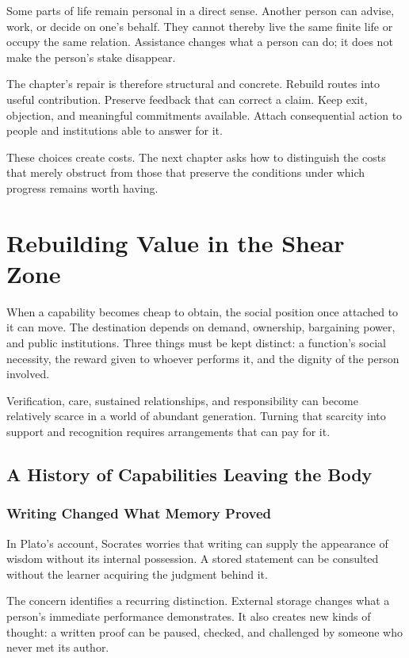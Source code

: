 \documentclass[11pt,openany]{book}
\begin{document}
Some parts of life remain personal in a direct sense. Another person can advise, work, or decide on one's behalf. They cannot thereby live the same finite life or occupy the same relation. Assistance changes what a person can do; it does not make the person's stake disappear.

The chapter's repair is therefore structural and concrete. Rebuild routes into useful contribution. Preserve feedback that can correct a claim. Keep exit, objection, and meaningful commitments available. Attach consequential action to people and institutions able to answer for it.

These choices create costs. The next chapter asks how to distinguish the costs that merely obstruct from those that preserve the conditions under which progress remains worth having.

\chapter{Rebuilding Value in the Shear Zone}

When a capability becomes cheap to obtain, the social position once attached to it can move. The destination depends on demand, ownership, bargaining power, and public institutions. Three things must be kept distinct: a function's social necessity, the reward given to whoever performs it, and the dignity of the person involved.

Verification, care, sustained relationships, and responsibility can become relatively scarce in a world of abundant generation. Turning that scarcity into support and recognition requires arrangements that can pay for it.

\section{A History of Capabilities Leaving the Body}

\subsection{Writing Changed What Memory Proved}

In Plato's account, Socrates worries that writing can supply the appearance of wisdom without its internal possession. A stored statement can be consulted without the learner acquiring the judgment behind it.

The concern identifies a recurring distinction. External storage changes what a person's immediate performance demonstrates. It also creates new kinds of thought: a written proof can be paused, checked, and challenged by someone who never met its author.
\end{document}
